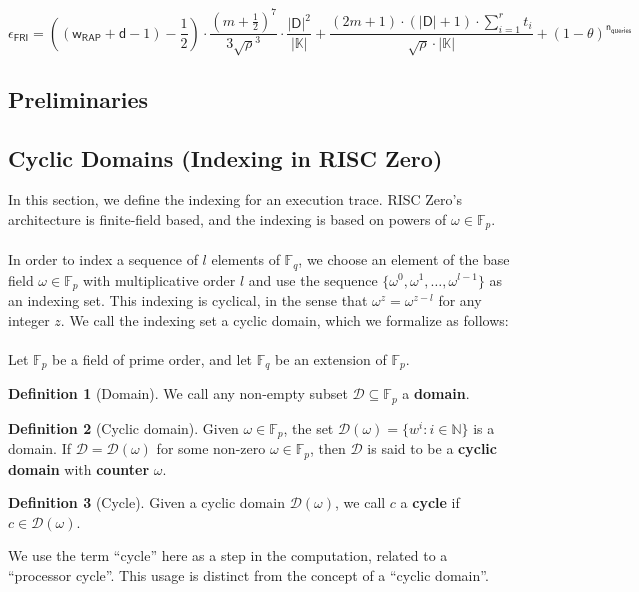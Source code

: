 \documentclass[10pt,letterpaper,titlepage]{article}
\newcommand{\GF}[1]{\mathbb{F}_{#1}}
\newcommand{\w}[0]{\omega}
\newcommand{\D}[0]{\mathcal{D}}
\theoremstyle{definition}
\newtheorem{definition}{Definition}
\begin{document}
\[
    \epsilon_\mathsf{FRI} =
    ((\mathsf{w_{RAP}}+\mathsf{d}-1)-\frac{1}{2})\cdot\frac{(m+\frac{1}{2})^7}{3\sqrt{\rho}^3}\cdot\frac{|\mathsf{D}|^2}{|\mathbb{K}|}
    +
    \frac{(2m+1)\cdot(|\mathsf{D}|+1)\cdot\sum^r_{i=1}t_i}{\sqrt{\rho}\cdot|\mathbb{K}|}
    +
    (1-\theta)^\mathsf{n_{queries}}
  \]
\pagebreak
\printbibliography
\pagebreak
\begin{appendices}
\section{Preliminaries}
\label{preliminaries}
\subsection{Cyclic Domains (Indexing in RISC Zero)}
\label{sequential time}
\label{cyclic domains}
In this section, we define the indexing for an execution trace. RISC Zero's architecture is finite-field based, and the indexing is based on powers of $\w\in\GF{p}$. \\
\\
In order to index a sequence of $l$ elements of $\GF{q}$, we choose an element of the base field $\w\in\GF{p}$ with multiplicative order $l$ and use the sequence $\{\w^0, \w^1, \ldots, \w^{l-1}\}$ as an indexing set.
This indexing is cyclical, in the sense that $\w^z=\w^{z-l}$ for any integer $z$.
We call the indexing set a cyclic domain, which we formalize as follows: \\
\\
Let $\GF{p}$ be a field of prime order, and let $\GF{q}$ be an extension of $\GF{p}$.
\begin{definition}[Domain]
  We call any non-empty subset $\D\subseteq\GF{p}$ a \textbf{domain}.
\end{definition}
\begin{definition}[Cyclic domain]
  Given $\w\in\GF{p}$, the set $\D(\omega)=\{w^i:i\in\mathbb{N}\}$ is a domain.
  If $\D=\D(\w)$ for some non-zero $\w\in\GF{p}$, then $\D$ is said to be a \textbf{cyclic domain} with \textbf{counter} $\w$.
\end{definition}
\begin{definition}[Cycle]
  Given a cyclic domain $\D(\w)$, we call $c$ a \textbf{cycle} if $c\in\D(\omega)$.
\end{definition}
\noindent
We use the term ``cycle'' here as a step in the computation, related to a ``processor cycle''.
This usage is distinct from the concept of a ``cyclic domain''.\\

\end{appendices}
\end{document}
